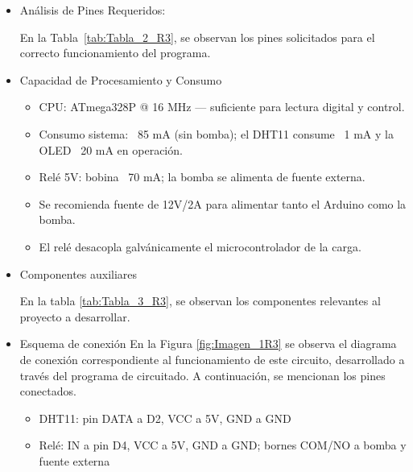 \begin{itemize}
\begin{itemize}
                \item Análisis de Pines Requeridos:
    
                En la Tabla~\ref{tab:Tabla_2_R3}, se observan los pines solicitados para el correcto funcionamiento del programa.
    
                

                \item Capacidad de Procesamiento y Consumo
                \begin{itemize}
                    \item CPU: ATmega328P @ 16 MHz — suficiente para lectura digital y control.

                    \item Consumo sistema: ~85 mA (sin bomba); el DHT11 consume ~1 mA y la OLED ~20 mA en operación.

                    \item Relé 5V: bobina ~70 mA; la bomba se alimenta de fuente externa.

                    \item Se recomienda fuente de 12V/2A para alimentar tanto el Arduino como la bomba.

                    \item El relé desacopla galvánicamente el microcontrolador de la carga.
                \end{itemize}
    
                \item Componentes auxiliares
    
                En la tabla \ref{tab:Tabla_3_R3}, se observan los componentes relevantes al proyecto a desarrollar.

                
    
                \item Esquema de conexión 
                En la Figura \ref{fig:Imagen_1R3} se observa el diagrama de conexión correspondiente al funcionamiento de este circuito, desarrollado a través del programa de circuitado. A continuación, se mencionan los pines conectados.
                \begin{itemize}
                    
                    \item DHT11: pin DATA a D2, VCC a 5V, GND a GND 
                
                    \item Relé: IN a pin D4, VCC a 5V, GND a GND; bornes COM/NO a bomba y fuente externa


\end{itemize}
\end{itemize}
\end{itemize}
